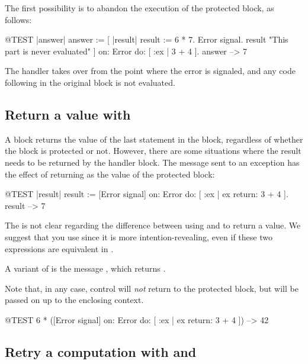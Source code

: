 The first possibility is to abandon the execution of the protected block, as follows:
\begin{code}{@TEST |answer|}
answer := [ |result|
	result := 6 * 7.
	Error signal.
	result 	"This part is never evaluated" ]	
	   on: Error
	   do: [ :ex | 3 + 4 ].
answer --> 7
\end{code}

The handler takes over from the point where the error is signaled, and any code following in the original block is not evaluated.

\subsection{Return a value with }
A block returns the value of the last statement in the block, regardless of whether the block is protected or not. However, there are some situations where the result needs to be returned by the handler block. The message  sent to an exception has the effect of returning  as the value of the protected block:

\begin{code}{@TEST |result|}
result := [Error signal]
	on: Error
	do: [ :ex | ex return: 3 + 4 ].
result --> 7
\end{code}

The  is not clear regarding the difference between using  and  to return a value. We suggest that you use  since it is more intention-revealing, even if these two expressions are equivalent in \pharo.

A variant of  is the message , which returns . 

Note that, in any case, control will \emph{not} return to the protected block, but will be passed on up to the enclosing context.

\begin{code}{@TEST}
6 * ([Error signal] on: Error do: [ :ex | ex return: 3 + 4 ]) --> 42
\end{code}

\subsection{Retry a computation with  and }

